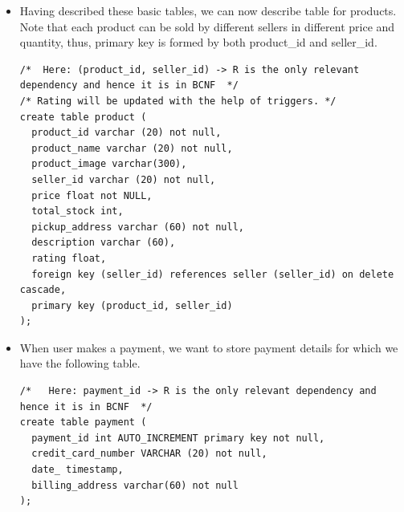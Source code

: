 \documentclass[a4paper,12pt]{article}
\begin{document}
\begin{itemize}
\begin{verbatim}
  \end{verbatim}
  \item Having described these basic tables, we can now describe table for products. Note that each product can be sold by different sellers in different price and quantity, thus, primary key is formed by both product\_id and seller\_id. 
  \begin{verbatim}
/*  Here: (product_id, seller_id) -> R is the only relevant dependency and hence it is in BCNF  */
/* Rating will be updated with the help of triggers. */
create table product (
  product_id varchar (20) not null,
  product_name varchar (20) not null,
  product_image varchar(300),
  seller_id varchar (20) not null,
  price float not NULL,
  total_stock int,
  pickup_address varchar (60) not null,
  description varchar (60),
  rating float,
  foreign key (seller_id) references seller (seller_id) on delete cascade,
  primary key (product_id, seller_id)
);

  \end{verbatim}
  \item When user makes a payment, we want to store payment details for which we have the following table.
  \begin{verbatim}
/*   Here: payment_id -> R is the only relevant dependency and hence it is in BCNF  */
create table payment (
  payment_id int AUTO_INCREMENT primary key not null,
  credit_card_number VARCHAR (20) not null,
  date_ timestamp,
  billing_address varchar(60) not null
);
    

\end{verbatim}
\end{itemize}
\end{document}
